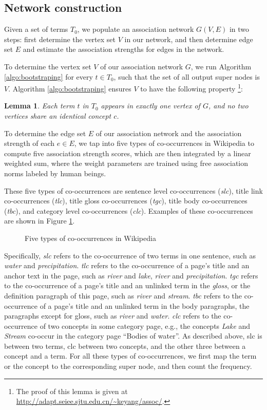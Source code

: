 \documentclass[letterpaper]{article}
\newcommand{\figref}[1]{Figure \ref{#1}}
\newtheorem{lemma}{Lemma}
\begin{document}
\subsection{Network construction}
\label{sec:construction}

Given a set of terms $T_0$, we populate an association network $G
(V, E)$ in two steps:
first determine the vertex set $V$ in our network, and then determine edge set
$E$ and estimate the association
strengths for edges in the network. 

To determine the vertex set $V$ of our association network $G$, we
run Algorithm \ref{algo:bootstraping} for every $t\in T_0$, such
that the set of all output super nodes is $V$. Algorithm
\ref{algo:bootstraping} ensures $V$ to have the following property
\footnote{The proof of this lemma is given at
\url{http://adapt.seiee.sjtu.edu.cn/~keyang/assoc/}.}:

\begin{lemma}
Each term $t$ in $T_0$ appears in exactly one vertex of $G$, and
no two vertices share an identical concept $c$.
\end{lemma}

To determine the edge set $E$ of our association network and the
association strength of each $e \in E$, we tap into five types of
co-occurrences in Wikipedia to compute five association strength scores, which are then integrated by a
linear weighted sum, where the weight parameters are trained 
using free association norms labeled by human beings. 

These five types of co-occurrences are sentence level co-occurrences
({\em slc}), title link co-occurrences ({\em tlc}), title gloss
co-occurrences ({\em tgc}), title body co-occurrences ({\em tbc}), and
category level co-occurrences ({\em clc}). Examples of these
co-occurrences are shown in \figref{fig:cooccur}.

\begin{figure}[htb]
\centering
{}
\caption{Five types of co-occurrences in Wikipedia}
\label{fig:cooccur}
\end{figure}

Specifically, {\em slc} refers to the co-occurrence of two terms in one
sentence, such as {\em water} and {\em precipitation}. 
{\em tlc} refers to the co-occurrence of a page's title and an
anchor text in the page, such as {\em river} and {\em lake}, {\em
river} and {\em precipitation}. {\em tgc} refers to the co-occurrence of a
page's title and an unlinked term in the \emph{gloss}, or the
definition paragraph of this page, such as {\em river} and {\em
stream}. {\em tbc} refers to the co-occurrence of a page's title and an
unlinked term in the body paragraphs, the paragraphs except
for gloss, such as {\em river} and
{\em water}. {\em clc} refers to the co-occurrence of two concepts in
some category page,
e.g., the concepts {\em Lake} and {\em Stream} co-occur in the category page 
``Bodies of water''.
As described above, slc is between two terms, clc between two concepts,
and the other three between a concept and a term. For all these types
of co-occurrences, we first map the term or the concept
to the corresponding super node, and then count the frequency.
\end{document}
